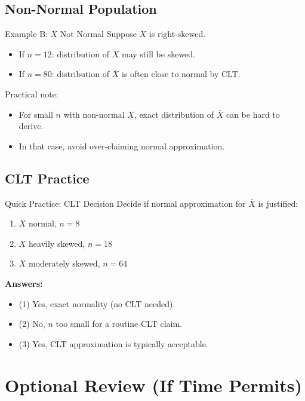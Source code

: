 \documentclass[aspectratio=169]{beamer}
\begin{document}
\subsection{Non-Normal Population}
\begin{frame}{Example B: \(X\) Not Normal}
  Suppose \(X\) is right-skewed.
  \begin{itemize}
    \item If \(n=12\): distribution of \(\bar{X}\) may still be skewed.
    \item If \(n=80\): distribution of \(\bar{X}\) is often close to normal by CLT.
  \end{itemize}

  \vspace{3pt}
  Practical note:
  \begin{itemize}
    \item For small \(n\) with non-normal \(X\), exact distribution of \(\bar{X}\) can be hard to derive.
    \item In that case, avoid over-claiming normal approximation.
  \end{itemize}
\end{frame}

\subsection{CLT Practice}
\begin{frame}{Quick Practice: CLT Decision}
  Decide if normal approximation for \(\bar{X}\) is justified:
  \begin{enumerate}
    \item \(X\) normal, \(n=8\)
    \item \(X\) heavily skewed, \(n=18\)
    \item \(X\) moderately skewed, \(n=64\)
  \end{enumerate}
  \pause
  \textbf{Answers:}
  \begin{itemize}
    \item (1) Yes, exact normality (no CLT needed).
    \item (2) No, \(n\) too small for a routine CLT claim.
    \item (3) Yes, CLT approximation is typically acceptable.
  \end{itemize}
\end{frame}

\section{Optional Review (If Time Permits)}
\end{document}
